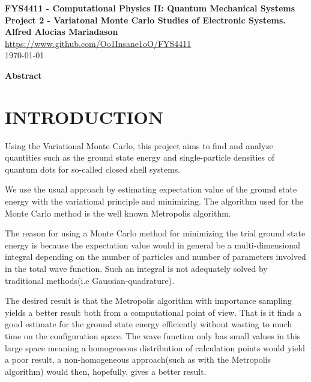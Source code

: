 \documentclass[a4paper, hidelinks, 10pt]{article}
\newcommand{\mdate}{\today}
\newcommand{\mtitle}{FYS4411}
\newcommand{\mauthor}{Alfred Alocias Mariadason}
\newcommand{\massignn}{Project 2}
\let\oldsection\section
\renewcommand{\section}[1]{\centering \oldsection{{#1}} \justifying}
\begin{document}
\thispagestyle{empty}
\begin{center} \vspace{1cm}
    \textbf{\Large{\mtitle\hspace{0.01pt} - Computational Physics II: Quantum
    Mechanical Systems}}\\ \vspace{0.5cm}
    \textbf{\large{\massignn\hspace{0.01pt} - Variatonal Monte Carlo Studies of
    Electronic Systems.}}\\ \vspace{1cm}
    \textbf{\large{\mauthor}}\\ \vspace{0.5cm}
    \large{\url{https://www.github.com/Oo1Insane1oO/FYS4411}} \\ \vspace{0.5cm}
    \Large{\mdate}\\ \vfill
\end{center}

\clearpage
\setcounter{page}{1}

\begin{center}
    \textbf{Abstract} \\
\end{center}

\section{INTRODUCTION}
\label{sec:introduction}
    Using the Variational Monte Carlo, this project aims to find and analyze
    quantities such as the ground state energy and single-particle densities of
    quantum dots for so-called closed shell systems.

    We use the usual approach by estimating expectation value of the ground
    state energy with the variational principle and minimizing. The algorithm
    used for the Monte Carlo method is the well known Metropolis algorithm.

    The reason for using a Monte Carlo method for minimizing the trial ground
    state energy is because the expectation value would in general be a
    multi-dimensional integral depending on the number of particles and number
    of parameters involved in the total wave function. Such an integral is not
    adequately solved by traditional methods(i.e Gaussian-quadrature).

    The desired result is that the Metropolis algorithm with importance
    sampling yields a better result both from a computational point of view.
    That is it finds a good estimate for the ground state energy efficiently
    without wasting to much time on the configuration space. The wave function
    only has small values in this large space meaning a homogeneous
    distribution of calculation points would yield a poor result, a
    non-homogeneous approach(such as with the Metropolis algorithm) would then,
    hopefully, gives a better result.
\end{document}
